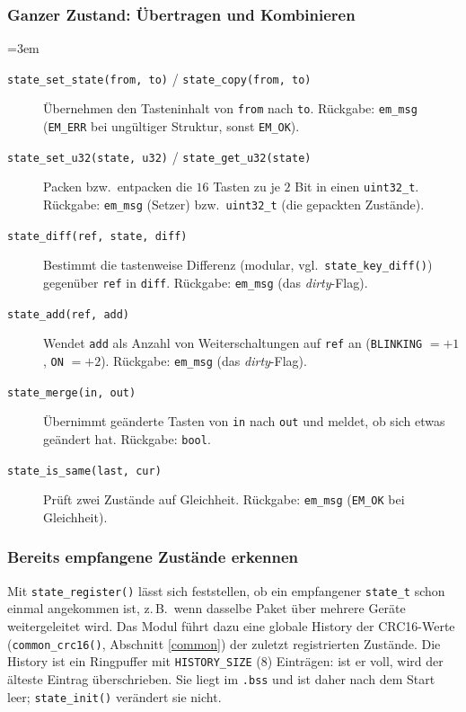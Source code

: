 \subsubsection*{Ganzer Zustand: Übertragen und Kombinieren}
{\sloppy\emergencystretch=3em
\begin{description}
\item[\texttt{state\_set\_state(from, to)} / \texttt{state\_copy(from, to)}]
  Übernehmen den Tasteninhalt von \verb|from| nach \verb|to|. Rückgabe:
  \verb|em_msg| (\verb|EM_ERR| bei ungültiger Struktur, sonst \verb|EM_OK|).
\item[\texttt{state\_set\_u32(state, u32)} / \texttt{state\_get\_u32(state)}]
  Packen bzw.\ entpacken die $16$ Tasten zu je $2$ Bit in einen
  \verb|uint32_t|. Rückgabe: \verb|em_msg| (Setzer) bzw.\ \verb|uint32_t| (die
  gepackten Zustände).
\item[\texttt{state\_diff(ref, state, diff)}] Bestimmt die tastenweise
  Differenz (modular, vgl.\ \verb|state_key_diff()|) gegenüber \verb|ref| in
  \verb|diff|. Rückgabe: \verb|em_msg| (das \emph{dirty}-Flag).
\item[\texttt{state\_add(ref, add)}] Wendet \verb|add| als Anzahl von
  Weiterschaltungen auf \verb|ref| an (\verb|BLINKING| $= +1$, \verb|ON| $=
  +2$). Rückgabe: \verb|em_msg| (das \emph{dirty}-Flag).
\item[\texttt{state\_merge(in, out)}] Übernimmt geänderte Tasten von \verb|in|
  nach \verb|out| und meldet, ob sich etwas geändert hat. Rückgabe:
  \verb|bool|.
\item[\texttt{state\_is\_same(last, cur)}] Prüft zwei Zustände auf Gleichheit.
  Rückgabe: \verb|em_msg| (\verb|EM_OK| bei Gleichheit).
\end{description}
\par}

\subsubsection*{Bereits empfangene Zustände erkennen}
Mit \verb|state_register()| lässt sich feststellen, ob ein empfangener
\verb|state_t| schon einmal angekommen ist, z.\,B.\ wenn dasselbe Paket über
mehrere Geräte weitergeleitet wird. Das Modul führt dazu eine globale History
der CRC16-Werte (\verb|common_crc16()|, Abschnitt \ref{common}) der zuletzt
registrierten Zustände. Die History ist ein Ringpuffer mit
\verb|HISTORY_SIZE| ($8$) Einträgen: ist er voll, wird der älteste Eintrag
überschrieben. Sie liegt im \verb|.bss| und ist daher nach dem Start leer;
\verb|state_init()| verändert sie nicht.

